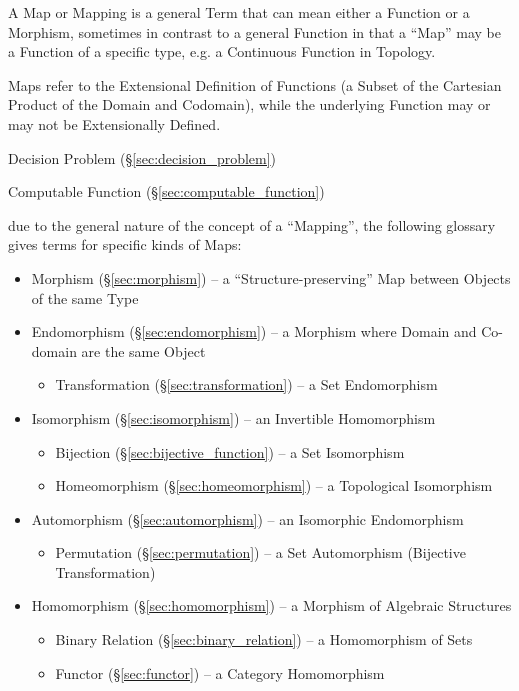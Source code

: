 A Map or Mapping is a general Term that can mean either a Function or a
Morphism, sometimes in contrast to a general Function in that a ``Map'' may be a
Function of a specific type, e.g. a Continuous Function in Topology.

Maps refer to the Extensional Definition of Functions (a Subset of the Cartesian
Product of the Domain and Codomain), while the underlying Function may or may
not be Extensionally Defined.

Decision Problem (\S\ref{sec:decision_problem})

Computable Function (\S\ref{sec:computable_function})

due to the general nature of the concept of a ``Mapping'', the following
glossary gives terms for specific kinds of Maps:
\begin{itemize}
  \item Morphism (\S\ref{sec:morphism}) -- a ``Structure-preserving'' Map
    between Objects of the same Type
  \item Endomorphism (\S\ref{sec:endomorphism}) -- a Morphism where Domain and
    Co-domain are the same Object
    \begin{itemize}
      \item Transformation (\S\ref{sec:transformation}) -- a Set Endomorphism
    \end{itemize}
  \item Isomorphism (\S\ref{sec:isomorphism}) -- an Invertible Homomorphism
    \begin{itemize}
      \item Bijection (\S\ref{sec:bijective_function}) -- a Set Isomorphism
      \item Homeomorphism (\S\ref{sec:homeomorphism}) -- a Topological
        Isomorphism
    \end{itemize}
  \item Automorphism (\S\ref{sec:automorphism}) -- an Isomorphic Endomorphism
    \begin{itemize}
      \item Permutation (\S\ref{sec:permutation}) -- a Set Automorphism
        (Bijective Transformation)
    \end{itemize}
  \item Homomorphism (\S\ref{sec:homomorphism}) -- a Morphism of Algebraic
    Structures
    \begin{itemize}
      \item Binary Relation (\S\ref{sec:binary_relation}) -- a Homomorphism of
        Sets
      \item Functor (\S\ref{sec:functor}) -- a Category Homomorphism

\end{itemize}
\end{itemize}
